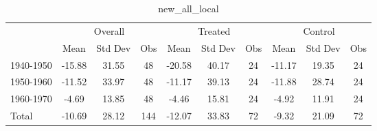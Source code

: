 \begin{table}[htbp]\centering
\def\sym#1{\ifmmode^{#1}\else\(^{#1}\)\fi}
\caption{new\_all\_local \label{tab1}}
\begin{tabular}{l*{3}{ccc}}
\toprule
                    &\multicolumn{3}{c}{Overall}           &\multicolumn{3}{c}{Treated}           &\multicolumn{3}{c}{Control}           \\
                    &        Mean&     Std Dev&         Obs&        Mean&     Std Dev&         Obs&        Mean&     Std Dev&         Obs\\
\midrule
1940-1950           &      -15.88&       31.55&          48&      -20.58&       40.17&          24&      -11.17&       19.35&          24\\
1950-1960           &      -11.52&       33.97&          48&      -11.17&       39.13&          24&      -11.88&       28.74&          24\\
1960-1970           &       -4.69&       13.85&          48&       -4.46&       15.81&          24&       -4.92&       11.91&          24\\
Total               &      -10.69&       28.12&         144&      -12.07&       33.83&          72&       -9.32&       21.09&          72\\
\bottomrule
\end{tabular}
\end{table}
